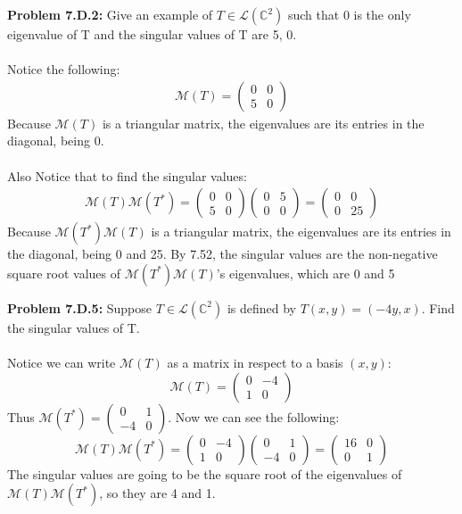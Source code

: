 \documentclass[12pt]{article}
\begin{document}
\newpage

\noindent \textbf{Problem 7.D.2: }Give an example of $T \in\mathcal{L}(\mathbb{C}^2)$ such that 0 is the only eigenvalue of T and the singular values of T are 5, 0.
\\ \\
Notice the following:
	\begin{align*}
		\mathcal{M}(T) = 
		\begin{pmatrix}
			0 & 0 \\
			5 & 0
		\end{pmatrix}
	\end{align*}
Because $\mathcal{M}(T)$ is a triangular matrix, the eigenvalues are its entries in the diagonal, being 0.
\\ \\
Also Notice that to find the singular values:
	\begin{align*}
		\mathcal{M}(T)\mathcal{M}(T^*) = 
		\begin{pmatrix}
		0 & 0 \\
		5 & 0
		\end{pmatrix}
		\begin{pmatrix}
		0 & 5 \\
		0 & 0
		\end{pmatrix} = 
		\begin{pmatrix}
		0 &  0\\
		0 & 25
		\end{pmatrix}
	\end{align*}
Because $\mathcal{M}(T^*)\mathcal{M}(T)$ is a triangular matrix, the eigenvalues are its entries in the diagonal, being 0 and 25.  By 7.52, the singular values are the non-negative square root values of $\mathcal{M}(T^*)\mathcal{M}(T)$'s eigenvalues, which are 0 and 5

\newpage 

\noindent \textbf{Problem 7.D.5: }Suppose $T \in \mathcal{L}(\mathbb{C}^2)$ is defined by $T(x,y) = (-4y,x)$. Find the singular values of T.
\\ \\
Notice we can write $\mathcal{M}(T)$ as a matrix in respect to a basis $(x,y)$:
	$$
	\mathcal{M}(T) = 
	\begin{pmatrix}
		0 & -4 \\
		1 & 0
	\end{pmatrix}
	$$ 
Thus $\mathcal{M}(T^*) = \begin{pmatrix}
	0 & 1 \\
	-4 & 0
\end{pmatrix}$.
Now we can see the following:
	$$
	\mathcal{M}(T)\mathcal{M}(T^*) = 
		\begin{pmatrix}
	0 & -4 \\
	1 & 0
	\end{pmatrix}
	\begin{pmatrix}
	0 & 1 \\
	-4 & 0
	\end{pmatrix}
	= 
	\begin{pmatrix}
	16 & 0 \\
	0 & 1
	\end{pmatrix}
	$$
The singular values are going to be the square root of the eigenvalues of $\mathcal{M}(T)\mathcal{M}(T^*)$, so they are 4 and 1.
\end{document}
